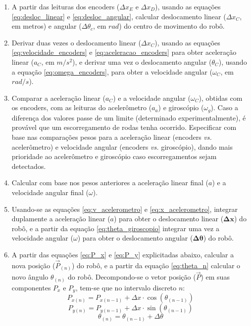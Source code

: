 \begin{enumerate}
  \item A partir das leituras dos encoders ($\Delta x_E$ e $\Delta x_D$), usando as equações \ref{eq:desloc_linear} e \ref{eq:desloc_angular}, calcular deslocamento linear ($\Delta x_C$, em metros) e angular ($\Delta \theta_c$, em $rad$) do centro de movimento do robô.
  
  \item Derivar duas vezes o deslocamento linear ($\Delta x_C$), usando as equações \ref{eq:velocidade_encoders} e \ref{eq:aceleracao_encoders} para obter aceleração linear ($a_C$, em $m/s^2$), e derivar uma vez o deslocamento angular ($\theta_C$), usando a equação \ref{eq:omega_encoders}, para obter a velocidade angular ($\omega_C$, em $rad/s$).
  
  \item Comparar a aceleração linear ($a_C$) e a velocidade angular ($\omega_C$), obtidas com os encoders, com as leituras do acelerômetro ($a_a$) e giroscópio ($\omega_g$). Caso a diferença dos valores passe de um limite (determinado experimentalmente), é provável que um escorregamento de rodas tenha ocorrido. Especificar com base nas comparações pesos para a aceleração linear (encoders \textit{vs.} acelerômetro) e velocidade angular (encoders \textit{vs.} giroscópio), dando mais prioridade ao acelerômetro e giroscópio caso escorregamentos sejam detectados.
  
  \item Calcular com base nos pesos anteriores a aceleração linear final ($a$) e a velocidade angular final ($\omega$).
  
  \item Usando-se as equações \ref{eq:v_acelerometro} e \ref{eq:x_acelerometro}, integrar duplamente a aceleração linear ($a$) para obter o deslocamento linear ($\bm{\Delta x}$) do robô, e a partir da equação \ref{eq:theta_giroscopio} integrar uma vez a velocidade angular ($\omega$) para obter o deslocamento angular ($\bm{\Delta \theta}$) do robô.
  
  \item A partir das equações \ref{eq:P_x} e \ref{eq:P_y} explicitadas abaixo, calcular a nova posição ($\overrightarrow{P}_{(n)}$) do robô, e a partir da equação \ref{eq:theta_n} calcular o novo ângulo $\theta_{(n)}$ do robô. Decompondo-se o vetor posição ($\overrightarrow{P}$) em suas componentes $P_x$ e $P_y$, tem-se que no intervalo discreto $n$:
    \begin{equation}
      P_{x (n)} = P_{x (n-1)} + \Delta x \cdot \cos{(\theta_{(n-1)})}
      \label{eq:P_x}
    \end{equation}
    \begin{equation}
      P_{y (n)} = P_{y (n-1)} + \Delta x \cdot \sin{(\theta_{(n-1)})}
      \label{eq:P_y}
    \end{equation}
    \begin{equation}
      \theta_{(n)} = \theta_{(n-1)} + \Delta \theta
      \label{eq:theta_n}
    \end{equation}
\end{enumerate}

